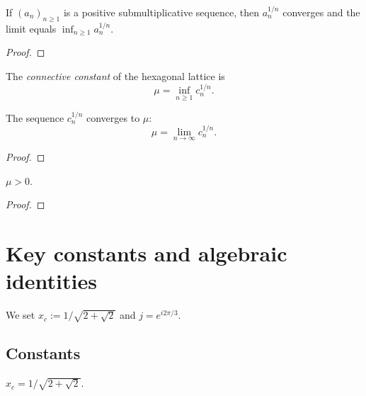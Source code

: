 \begin{theorem}\label{thm:fekete}
\leanok
  If $(a_n)_{n \geq 1}$ is a positive submultiplicative sequence, then
  $a_n^{1/n}$ converges and the limit equals $\inf_{n \geq 1} a_n^{1/n}$.
\end{theorem}
\begin{proof}
\leanok
\end{proof}

\begin{definition}\label{def:connective_constant}
\leanok
{}
  The \emph{connective constant} of the hexagonal lattice is
  \[ \mu = \inf_{n \geq 1} c_n^{1/n}. \]
\end{definition}

\begin{theorem}\label{thm:cc_is_limit}
\leanok
{}
  The sequence $c_n^{1/n}$ converges to $\mu$:
  \[ \mu = \lim_{n \to \infty} c_n^{1/n}. \]
\end{theorem}
\begin{proof}
\leanok
\end{proof}

\begin{theorem}\label{thm:cc_pos}
\leanok
{}
  $\mu > 0$.
\end{theorem}
\begin{proof}
\leanok
\end{proof}


\chapter{Key constants and algebraic identities}\label{chap:constants}

We set $x_c := 1/\sqrt{2+\sqrt{2}}$ and $j = e^{i2\pi/3}$.

\section{Constants}

\begin{definition}\label{def:xc}
\leanok
  $x_c = 1/\sqrt{2+\sqrt{2}}$.
\end{definition}

